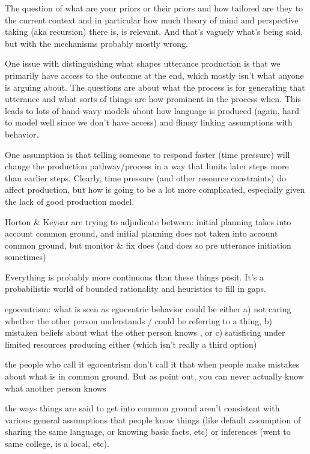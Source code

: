 \documentclass[]{article}
\begin{document}
The question of what are your priors or their priors and how tailored are they to the current context and in particular how much theory of mind and perspective taking (aka recursion) there is, is relevant. And that's vaguely what's being said, but with the mechanisms probably mostly wrong. 

One issue with distinguishing what shapes utterance production is that we primarily have access to the outcome at the end, which mostly isn't what anyone is arguing about. The questions are about what the process is for generating that utterance and what sorts of things are how prominent in the process when. This leads to lots of hand-wavy models about how language is produced (again, hard to model well since we don't have access) and flimsy linking assumptions with behavior. 

One assumption is that telling someone to respond faster (time pressure) will change the production pathway/process in a way that limits later steps more than earlier steps. Clearly, time pressure (and other resource constraints) do affect production, but how is going to be a lot more complicated, especially given the lack of good production model. 

Horton \& Keysar are trying to adjudicate between: initial planning takes into account common ground, and initial planning does not taken into account common ground, but monitor \& fix does (and does so pre utterance initiation sometimes) 

Everything is probably more continuous than these things posit. It's a probabilistic world of bounded rationality and heuristics to fill in gaps. 

egocentrism: what is seen as egocentric behavior could be either a) not caring whether the other person understands / could be referring to a thing, b) mistaken beliefs about what the other person knows , or c) satisficing under limited resources producing either (which isn't really a third option) 

the people who call it egocentrism don't call it that when people make mistakes about what is in common ground. But as \cite{hanna2003} point out, you can never actually know what another person knows 

the ways things are said to get into common ground aren't consistent with various general assumptions that people know things (like default assumption of sharing the same language, or knowing basic facts, etc) or inferences (went to same college, is a local, etc). 
\end{document}
